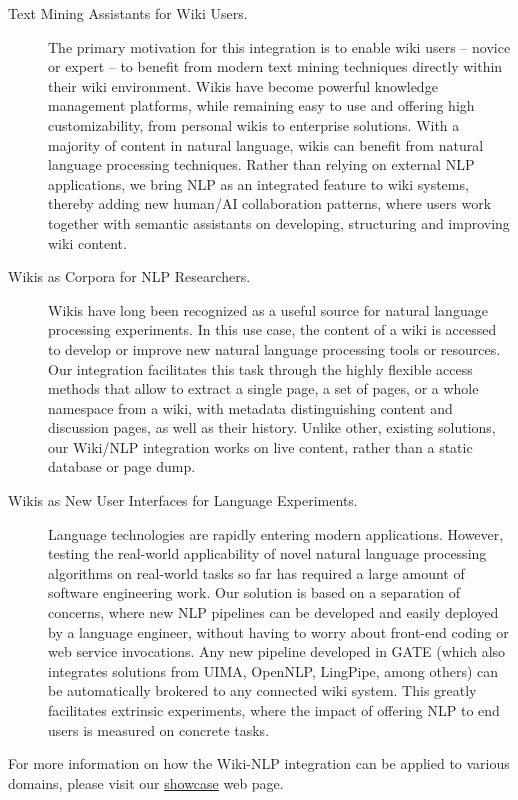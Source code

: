 \begin{description}
\item[Text Mining Assistants for Wiki Users.] The primary motivation for this integration is to enable wiki users – novice or expert – to benefit from modern text mining techniques directly within their wiki environment. Wikis have become powerful knowledge management platforms, while remaining easy to use and offering high customizability, from personal wikis to enterprise solutions. With a majority of content in natural language, wikis can benefit from natural language processing techniques. Rather than relying on external NLP applications, we bring NLP as an integrated feature to wiki systems, thereby adding new human/AI collaboration patterns, where users work together with semantic assistants on developing, structuring and improving wiki content.
\item[Wikis as Corpora for NLP Researchers.] Wikis have long been recognized as a useful source for natural language processing experiments. In this use case, the content of a wiki is accessed to develop or improve new natural language processing tools or resources. Our integration facilitates this task through the highly flexible access methods that allow to extract a single page, a set of pages, or a whole namespace from a wiki, with metadata distinguishing content and discussion pages, as well as their history. Unlike other, existing solutions, our Wiki/NLP integration works on live content, rather than a static database or page dump.
\item[Wikis as New User Interfaces for Language Experiments.]Language technologies are rapidly entering modern applications. However, testing the real-world applicability of novel natural language processing algorithms on real-world tasks so far has required a large amount of software engineering work. Our solution is based on a separation of concerns, where new NLP pipelines can be developed and easily deployed by a language engineer, without having to worry about front-end coding or web service invocations. Any new pipeline developed in GATE (which also integrates solutions from UIMA, OpenNLP, LingPipe, among others) can be automatically brokered to any connected wiki system. This greatly facilitates extrinsic experiments, where the impact of offering NLP to end users is measured on concrete tasks.
\end{description}


\noindent
For more information on how the Wiki-NLP integration can be applied to various domains, please visit our \href{http://www.semanticsoftware.info/semantic-assistants-wiki-nlp-showcase}{showcase} web page.

